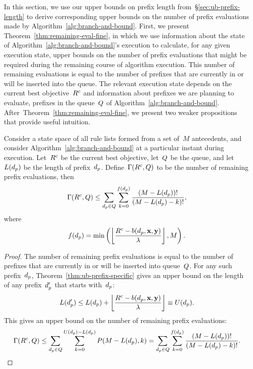 In this section, we use our upper bounds on prefix length
from~\S\ref{sec:ub-prefix-length} to derive corresponding
upper bounds on the number of prefix evaluations made by
Algorithm~\ref{alg:branch-and-bound}.
%
First, we present Theorem~\ref{thm:remaining-eval-fine},
in which we use information about the state of
Algorithm~\ref{alg:branch-and-bound}'s execution
to calculate, for any given execution state,
upper bounds on the number of prefix evaluations that might
be required during the remaining course of algorithm execution.
%
This number of remaining evaluations is equal to the number of
prefixes that are currently in or will be inserted into the queue.
%
The relevant execution state depends on the current
best objective~${R^c}$ and information about
prefixes we are planning to evaluate, \ie prefixes in the
queue~$Q$ of Algorithm~\ref{alg:branch-and-bound}.
%
After~Theorem~\ref{thm:remaining-eval-fine}, we present two
weaker propositions that provide useful intuition.

\begin{theorem}
\label{thm:remaining-eval-fine}
Consider a state space of all rule lists formed from a set of~$M$ antecedents,
and consider Algorithm~\ref{alg:branch-and-bound} at a particular instant
during execution.
%
Let~${R^c}$ be the current best objective, let~$Q$ be the queue,
and let~$L(d_p)$ be the length of prefix~$d_p$.
%
Define~${\Gamma({R^c}, Q)}$ to be the number of remaining
prefix evaluations, then
\begin{align}
\Remaining(\CurrentObj, \Queue)
\le \sum_{\Prefix \in Q} \sum_{k=0}^{f(\Prefix)} \frac{(M - L(\Prefix))!}{(M - L(\Prefix) - k)!},
\end{align}
where
\begin{align}
f(\Prefix) = \min \left( \left\lfloor
  \frac{\CurrentObj - b(\Prefix, \x, \y)}{\Reg} \right\rfloor, M \right).
\label{eq:f}
\end{align}
\end{theorem}

\begin{proof}
The number of remaining prefix evaluations is equal to the number of
prefixes that are currently in or will be inserted into queue~$Q$.
%
For any such prefix~$d_p$, Theorem~\ref{thm:ub-prefix-specific}
gives an upper bound on the length of any prefix~$d_p'$
that starts with~$d_p$:
\begin{align}
L(\Prefix') \le L(\Prefix) + \left\lfloor \frac{\CurrentObj - b(\Prefix, \x, \y)}{\Reg} \right\rfloor
\equiv U(\Prefix).
\end{align}
This gives an upper bound on the number of remaining prefix evaluations:
\begin{align}
\Remaining(\CurrentObj, \Queue)
\le \sum_{\Prefix \in Q} \sum_{k=0}^{U(\Prefix) - L(\Prefix)} P(M - L(\Prefix), k)
= \sum_{\Prefix \in Q} \sum_{k=0}^{f(\Prefix)} \frac{(M - L(\Prefix))!}{(M - L(\Prefix) - k)!}.
\end{align}
\end{proof}


